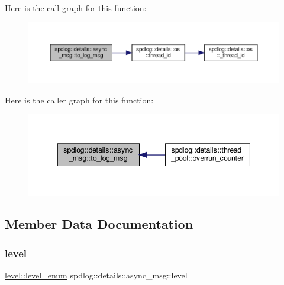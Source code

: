 Here is the call graph for this function\+:
\nopagebreak
\begin{figure}[H]
\begin{center}
\leavevmode
\includegraphics[width=350pt]{structspdlog_1_1details_1_1async__msg_a2c5c21ef52bd0b7241ed6ac56f480fd2_cgraph}
\end{center}
\end{figure}
Here is the caller graph for this function\+:
\nopagebreak
\begin{figure}[H]
\begin{center}
\leavevmode
\includegraphics[width=344pt]{structspdlog_1_1details_1_1async__msg_a2c5c21ef52bd0b7241ed6ac56f480fd2_icgraph}
\end{center}
\end{figure}


\subsection{Member Data Documentation}
\mbox{\label{structspdlog_1_1details_1_1async__msg_a3e2008e47f70761ff3240ab56a3be370}} 
\subsubsection{\texorpdfstring{level}{level}}
{\footnotesize\ttfamily \hyperlink{namespacespdlog_1_1level_a35f5227e5daf228d28a207b7b2aefc8b}{level\+::level\+\_\+enum} spdlog\+::details\+::async\+\_\+msg\+::level}



